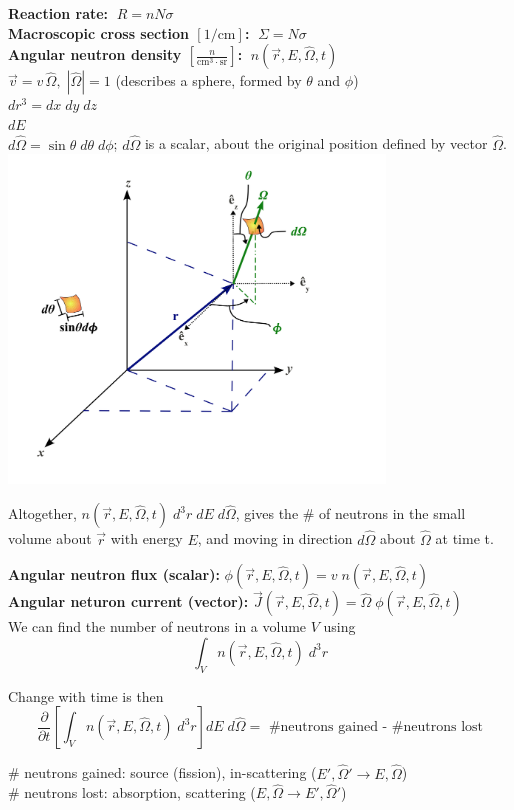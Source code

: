 \documentclass{report}
\newcommand{\p}{\partial}
\newcommand{\ppt}{\frac{\p}{\p t}}
\newcommand{\Xs}{\Sigma}
\newcommand{\xs}{\sigma}
\newcommand{\pos}{\vec{r}}
\newcommand{\cur}{\vec{J}}
\newcommand{\Oh}{\hat{\Omega}}
\newcommand{\rEOt}{(\pos,E,\Oh,t)}
\begin{document}
\textbf{Reaction rate:} $ \; R = n N \xs$\\
\textbf{Macroscopic cross section $[1/\text{cm}]$:} $ \; \Xs = N \xs $\\
\textbf{Angular neutron density $[\frac{n}{\text{cm}^3 \cdot \text{sr}}]$:} $\; n\rEOt$\\

$\vec{v} = v \,\Oh, \; |\Oh| = 1$ (describes a sphere, formed by $\theta$ and $\phi$)\\
$ dr^3 = dx \; dy \; dz$\\
$ dE$\\
$ d\Oh = \sin\theta \; d\theta \; d\phi$; $d\Oh$ is a scalar, about the original position defined by vector $\Oh$.\\

\includegraphics[width=10cm]{Lecture02_PhaseSpace.png}

Altogether, $ n\rEOt \; d^3r \; dE \; d\Oh$, gives the \# of neutrons in the small volume about $\pos$ with energy $E$, and moving in direction $d\Oh$ about $\Oh$ at time t.

\textbf{Angular neutron flux (scalar):} $\phi\rEOt = v \; n\rEOt$\\
\textbf{Angular neturon current (vector):} $\cur\rEOt = \Oh \; \phi\rEOt$\\

We can find the number of neutrons in a volume $V$ using
$$ \int_V{ n\rEOt \; d^3r }$$

Change with time is then 
$$ \ppt\left[\int_V{ n\rEOt \; d^3r }\right] dE \; d\Oh = \text{ \# neutrons gained - \# neutrons lost}$$

\# neutrons gained: source (fission), in-scattering ($E', \Oh' \rightarrow E, \Oh$)\\
\# neutrons lost: absorption, scattering ($E, \Oh \rightarrow E', \Oh'$)\\
\end{document}
